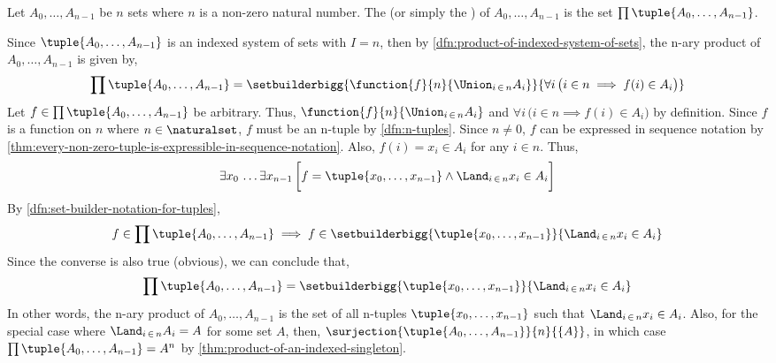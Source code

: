 \begin{dfn}
    \label{dfn:n-ary-product}
    Let \( A_{0},\dots,A_{n-1} \) be \( n \) sets where \( n \) is a non-zero natural number.
    The  (or simply the ) of \( A_{0},\dots,A_{n-1} \)
    is the set \( \prod \tuple{A_{0}, \dots, A_{n-1}} \).
\end{dfn}

\begin{rem}
    Since \( \tuple{A_{0}, \dots, A_{n-1}} \) is an indexed system of sets with \( I = n \),
    then by \cref{dfn:product-of-indexed-system-of-sets}, the n-ary product of \( A_{0},\dots,A_{n-1} \)
    is given by,
    \begin{equation*}
        \prod \tuple{A_{0}, \dots, A_{n-1}} =
        \setbuilderbigg{\function{f}{n}{\Union_{i \,\in\, n} A_{i}}}{\forall i \, \big( i \in n \implies f(i) \in A_{i} \big)}
    \end{equation*}
    Let \( f \in \prod \tuple{A_{0}, \dots, A_{n-1}} \) be arbitrary. Thus, \( \function{f}{n}{\Union_{i \,\in\, n} A_{i}} \)
    and \( \forall i \, \big( i \in n \implies f(i) \in A_{i} \big) \) by definition. Since \( f \) is a function on \( n \)
    where \( n \in \naturalset \), \( f \) must be an n-tuple by \cref{dfn:n-tuples}. Since \( n \neq 0 \), \( f \)
    can be expressed in sequence notation by \cref{thm:every-non-zero-tuple-is-expressible-in-sequence-notation}.
    Also, \( f(i) = x_{i} \in A_{i} \) for any \( i \in n \).
    Thus,
    \begin{equation*}
        \exists x_{0} \, \dots \exists x_{n-1} \, \bigg[ f = \tuple{x_{0}, \dots, x_{n-1}} \land \Land_{i \,\in\, n} x_{i} \in A_{i} \bigg]
    \end{equation*}
    By \cref{dfn:set-builder-notation-for-tuples},
    \begin{equation*}
        f \in \prod \tuple{A_{0}, \dots, A_{n-1}} \implies f \in \setbuilderbigg{\tuple{x_{0}, \dots, x_{n-1}}}{\Land_{i \,\in\, n} x_{i} \in A_{i}}
    \end{equation*}
    Since the converse is also true (obvious), we can conclude that,
    \begin{equation*}
        \prod \tuple{A_{0}, \dots, A_{n-1}} = \setbuilderbigg{\tuple{x_{0}, \dots, x_{n-1}}}{\Land_{i \,\in\, n} x_{i} \in A_{i}}
    \end{equation*}
    In other words, the n-ary product of \( A_{0},\dots,A_{n-1} \) is the set of all n-tuples \( \tuple{x_{0}, \dots, x_{n-1}} \)
    such that \( \Land_{i \,\in\, n} x_{i} \in A_{i} \).
    Also, for the special case where \( \Land_{i \,\in\, n} A_{i} = A \) for some set \( A \), then,
    \( \surjection{\tuple{A_{0}, \dots, A_{n-1}}}{n}{\mleft\{ A \mright\}} \),
    in which case \( \prod \tuple{A_{0}, \dots, A_{n-1}} = A^{n} \) by \cref{thm:product-of-an-indexed-singleton}.
\end{rem}

